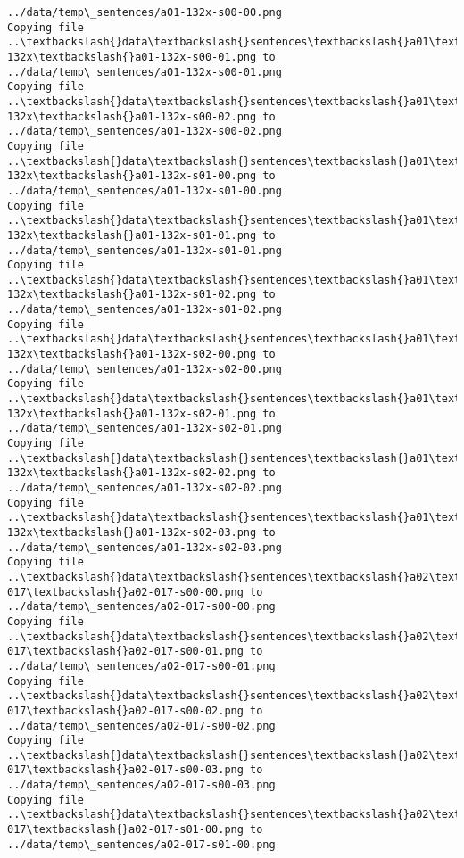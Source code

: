 \documentclass[11pt]{article}
\begin{document}
\begin{Verbatim}[commandchars=\\\{\}]
../data/temp\_sentences/a01-132x-s00-00.png
Copying file ..\textbackslash{}data\textbackslash{}sentences\textbackslash{}a01\textbackslash{}a01-132x\textbackslash{}a01-132x-s00-01.png to
../data/temp\_sentences/a01-132x-s00-01.png
Copying file ..\textbackslash{}data\textbackslash{}sentences\textbackslash{}a01\textbackslash{}a01-132x\textbackslash{}a01-132x-s00-02.png to
../data/temp\_sentences/a01-132x-s00-02.png
Copying file ..\textbackslash{}data\textbackslash{}sentences\textbackslash{}a01\textbackslash{}a01-132x\textbackslash{}a01-132x-s01-00.png to
../data/temp\_sentences/a01-132x-s01-00.png
Copying file ..\textbackslash{}data\textbackslash{}sentences\textbackslash{}a01\textbackslash{}a01-132x\textbackslash{}a01-132x-s01-01.png to
../data/temp\_sentences/a01-132x-s01-01.png
Copying file ..\textbackslash{}data\textbackslash{}sentences\textbackslash{}a01\textbackslash{}a01-132x\textbackslash{}a01-132x-s01-02.png to
../data/temp\_sentences/a01-132x-s01-02.png
Copying file ..\textbackslash{}data\textbackslash{}sentences\textbackslash{}a01\textbackslash{}a01-132x\textbackslash{}a01-132x-s02-00.png to
../data/temp\_sentences/a01-132x-s02-00.png
Copying file ..\textbackslash{}data\textbackslash{}sentences\textbackslash{}a01\textbackslash{}a01-132x\textbackslash{}a01-132x-s02-01.png to
../data/temp\_sentences/a01-132x-s02-01.png
Copying file ..\textbackslash{}data\textbackslash{}sentences\textbackslash{}a01\textbackslash{}a01-132x\textbackslash{}a01-132x-s02-02.png to
../data/temp\_sentences/a01-132x-s02-02.png
Copying file ..\textbackslash{}data\textbackslash{}sentences\textbackslash{}a01\textbackslash{}a01-132x\textbackslash{}a01-132x-s02-03.png to
../data/temp\_sentences/a01-132x-s02-03.png
Copying file ..\textbackslash{}data\textbackslash{}sentences\textbackslash{}a02\textbackslash{}a02-017\textbackslash{}a02-017-s00-00.png to
../data/temp\_sentences/a02-017-s00-00.png
Copying file ..\textbackslash{}data\textbackslash{}sentences\textbackslash{}a02\textbackslash{}a02-017\textbackslash{}a02-017-s00-01.png to
../data/temp\_sentences/a02-017-s00-01.png
Copying file ..\textbackslash{}data\textbackslash{}sentences\textbackslash{}a02\textbackslash{}a02-017\textbackslash{}a02-017-s00-02.png to
../data/temp\_sentences/a02-017-s00-02.png
Copying file ..\textbackslash{}data\textbackslash{}sentences\textbackslash{}a02\textbackslash{}a02-017\textbackslash{}a02-017-s00-03.png to
../data/temp\_sentences/a02-017-s00-03.png
Copying file ..\textbackslash{}data\textbackslash{}sentences\textbackslash{}a02\textbackslash{}a02-017\textbackslash{}a02-017-s01-00.png to
../data/temp\_sentences/a02-017-s01-00.png

\end{Verbatim}
\end{document}
